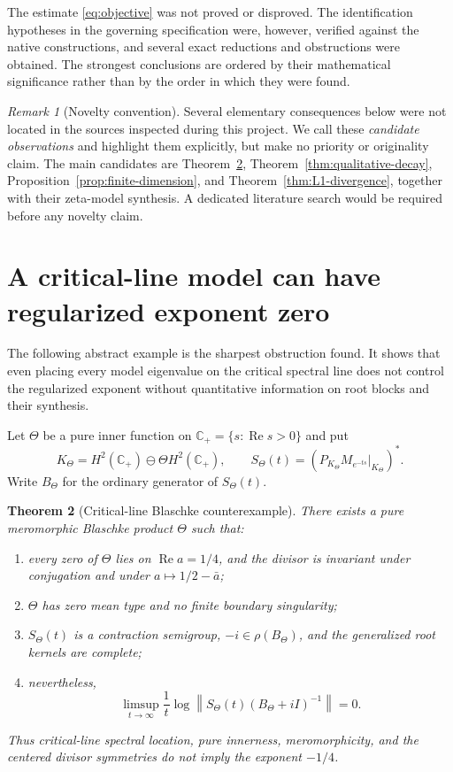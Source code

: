 \documentclass[11pt]{amsart}
\newtheorem{theorem}{Theorem}[section]
\theoremstyle{definition}
\theoremstyle{remark}
\newtheorem{remark}[theorem]{Remark}
\DeclareMathOperator{\Repart}{Re}
\newcommand{\C}{\mathbb C}
\newcommand{\norm}[1]{\left\lVert #1\right\rVert}
\begin{document}
The estimate \eqref{eq:objective} was not proved or disproved.  The
identification hypotheses in the governing specification were, however,
verified against the native constructions, and several exact reductions and
obstructions were obtained.  The strongest conclusions are ordered by their
mathematical significance rather than by the order in which they were found.

\begin{remark}[Novelty convention]\label{rem:novelty}
Several elementary consequences below were not located in the sources
inspected during this project.  We call these \emph{candidate observations}
and highlight them explicitly, but make no priority or originality claim.
The main candidates are Theorem~\ref{thm:abstract-counterexample},
Theorem~\ref{thm:qualitative-decay},
Proposition~\ref{prop:finite-dimension}, and
Theorem~\ref{thm:L1-divergence}, together with their zeta-model synthesis.
A dedicated literature search would be required before any novelty claim.
\end{remark}

\section{A critical-line model can have regularized exponent zero}
\label{sec:counterexample}

The following abstract example is the sharpest obstruction found.  It shows
that even placing every model eigenvalue on the critical spectral line does
not control the regularized exponent without quantitative information on root
blocks and their synthesis.

Let $\Theta$ be a pure inner function on $\C_+=\{s:\Repart s>0\}$ and put
\[
 K_\Theta=H^2(\C_+)\ominus\Theta H^2(\C_+),
 \qquad
 S_\Theta(t)=
 \left(P_{K_\Theta}M_{e^{-ts}}\big|_{K_\Theta}\right)^*.
\]
Write $B_\Theta$ for the ordinary generator of $S_\Theta(t)$.

\begin{theorem}[Critical-line Blaschke counterexample]
\label{thm:abstract-counterexample}
There exists a pure meromorphic Blaschke product $\Theta$ such that:
\begin{enumerate}[label=\textup{(\roman*)}]
 \item every zero of $\Theta$ lies on $\Repart a=1/4$, and the divisor is
 invariant under conjugation and under $a\mapsto1/2-\bar a$;
 \item $\Theta$ has zero mean type and no finite boundary singularity;
 \item $S_\Theta(t)$ is a contraction semigroup, $-i\in\rho(B_\Theta)$,
 and the generalized root kernels are complete;
 \item nevertheless,
 \[
  \limsup_{t\to\infty}\frac1t
  \log\norm{S_\Theta(t)(B_\Theta+iI)^{-1}}=0.
 \]
\end{enumerate}
Thus critical-line spectral location, pure innerness, meromorphicity, and the
centered divisor symmetries do not imply the exponent $-1/4$.
\end{theorem}
\end{document}
